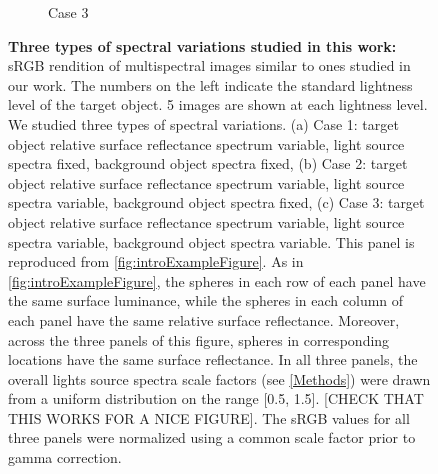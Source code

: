 \documentclass{jov}
\begin{document}
\begin{figure}
\begin{subfigure}[b]{0.33 \textwidth}
        \caption{Case 3}
        \label{fig:allSpectraVarying}
    \end{subfigure}    
    \caption{{\bf Three types of spectral variations studied in this work:} sRGB rendition of multispectral images similar to ones studied in our work. The numbers on the left indicate the standard lightness level of the target object. 5 images are shown at each lightness level. We studied three types of spectral variations. (a) Case 1: target object relative surface reflectance spectrum variable, light source spectra fixed, background object spectra fixed, (b) Case 2: target object relative surface reflectance spectrum variable, light source spectra variable, background object spectra fixed, (c) Case 3: target object relative surface reflectance spectrum variable, light source spectra variable, background object spectra variable. This panel is reproduced from \ref{fig:introExampleFigure}. As in \ref{fig:introExampleFigure}, the spheres in each row of each panel have the same surface luminance, while the spheres in each column of each panel have the same relative surface reflectance.  Moreover, across the three panels of this figure, spheres in corresponding locations have the same surface reflectance. In all three panels, the overall lights source spectra scale factors (see \ref{Methods}) were drawn from a uniform distribution on the range [0.5, 1.5]. [CHECK THAT THIS WORKS FOR A NICE FIGURE].  The sRGB values for all three panels were normalized using a common scale factor prior to gamma correction.} 
\label{fig:studiedCases}
\end{figure}
\end{document}
